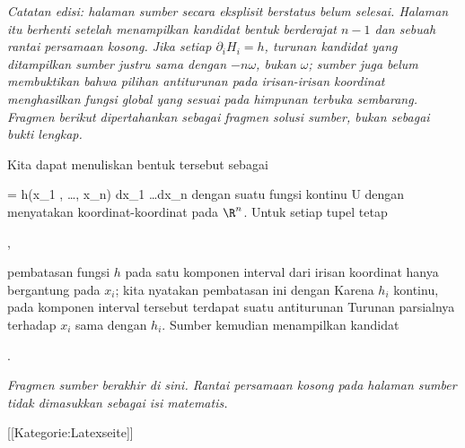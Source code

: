 \textit{Catatan edisi: halaman sumber secara eksplisit berstatus belum
selesai. Halaman itu berhenti setelah menampilkan kandidat bentuk
berderajat $n-1$ dan sebuah rantai persamaan kosong. Jika setiap
$\partial_iH_i=h$, turunan kandidat yang ditampilkan sumber justru sama
dengan $-n\omega$, bukan $\omega$; sumber juga belum membuktikan bahwa
pilihan antiturunan pada irisan-irisan koordinat menghasilkan fungsi global
yang sesuai pada himpunan terbuka sembarang. Fragmen berikut dipertahankan
sebagai fragmen solusi sumber, bukan sebagai bukti lengkap.}

Kita dapat menuliskan bentuk tersebut sebagai

\mavergleichskettedisp
{\vergleichskette
{ \omega
}
{ =} { h(x_1 , \ldots , x_n) dx_1 \wedge \ldots \wedge dx_n
}
{ } {
}
{ } {
}
{ } {
}
}
{}{}{}
dengan suatu fungsi kontinu
 { U } {\R
} {}
dengan
 menyatakan koordinat-koordinat pada $\R^n$.
Untuk setiap tupel tetap

 { , }

pembatasan fungsi $h$
pada satu komponen interval dari irisan koordinat hanya bergantung pada
$x_i$; kita nyatakan pembatasan ini dengan
Karena $h_i$ kontinu, pada komponen interval tersebut terdapat suatu
antiturunan
Turunan parsialnya terhadap $x_i$ sama dengan $h_i$. Sumber kemudian
menampilkan kandidat

 { . }

\textit{Fragmen sumber berakhir di sini. Rantai persamaan kosong pada
halaman sumber tidak dimasukkan sebagai isi matematis.}

 [[Kategorie:Latexseite]]
